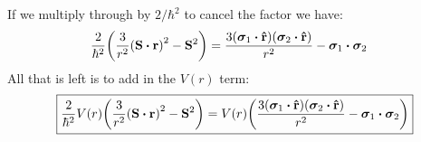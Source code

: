 \documentclass[12pt]{article}
\begin{document}
If we multiply through by $2/\hbar^2$ to cancel the factor we have:
\begin{align*}
  \frac2{\hbar^2}\qty(\frac{3}{r^2}\qty(\vb{S}\vdot\vb{r})^2-\vb{S}^2)&=
  \frac{3(\bm\sigma_1\vdot\vu{r})(\bm\sigma_2\vdot\vu{r})}{r^2}
  -\bm\sigma_1\vdot\bm\sigma_2
\end{align*}
All that is left is to add in the $V(r)$ term:
\begin{align}
  \boxed{
    \frac2{\hbar^2}V(r)\qty(\frac{3}{r^2}\qty(\vb{S}\vdot\vb{r})^2-\vb{S}^2)=
    V(r)\qty(\frac{3(\bm\sigma_1\vdot\vu{r})(\bm\sigma_2\vdot\vu{r})}{r^2}
    -\bm\sigma_1\vdot\bm\sigma_2)}
\end{align}
\end{document}
